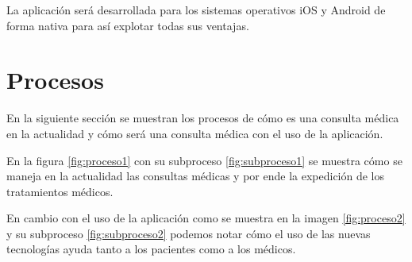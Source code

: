 \begin{ReqSist}
	{
		La aplicación será desarrollada para los sistemas operativos iOS y Android de forma nativa para así explotar todas sus ventajas.
	}
	{\alta}
	{}{}
\end{ReqSist}





	


\section{Procesos}

En la siguiente sección se muestran los procesos de cómo es una consulta médica en la actualidad y cómo será una consulta médica con el uso de la aplicación.


En la figura \ref{fig:proceso1} con su subproceso \ref{fig:subproceso1} se muestra cómo se maneja en la actualidad las consultas médicas y por ende la expedición de los tratamientos médicos.

En cambio con el uso de la aplicación como se muestra en la imagen \ref{fig:proceso2} y su subproceso \ref{fig:subproceso2} podemos notar cómo el uso de las nuevas tecnologías ayuda tanto a los pacientes como a los médicos.

